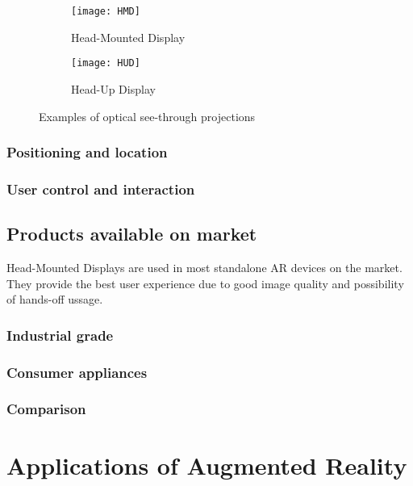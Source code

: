 \documentclass[printmode,en]{mgr}
\begin{document}
\begin{figure}[!ht]
\centering
\begin{subfigure}{.5\textwidth}
  \centering
  \texttt{[image: HMD]}
  \caption{Head-Mounted Display}
  \label{fig:headMounted}
\end{subfigure}%
\begin{subfigure}{.5\textwidth}
  \centering
  \texttt{[image: HUD]}
  \caption{Head-Up Display}
  \label{fig:headUp}
\end{subfigure}
\caption{Examples of optical see-through projections}
\label{fig:seeThroughAR}
\end{figure}

\subsection{Positioning and location}

\subsection{User control and interaction}

\section{Products available on market}
Head-Mounted Displays are used in most standalone AR devices on the market. They provide the best user experience due to good image quality and possibility of hands-off ussage.

\subsection{Industrial grade}

\subsection{Consumer appliances}

\subsection{Comparison}

\chapter{Applications of Augmented Reality}
\end{document}
